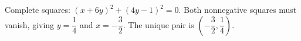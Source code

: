 Complete squares: $(x+6y)^2+(4y-1)^2=0$. Both nonnegative squares must vanish, giving $y=\dfrac{1}{4}$ and $x=-\dfrac{3}{2}$. The unique pair is $\boxed{(-\dfrac{3}{2},\dfrac{1}{4})}$.
